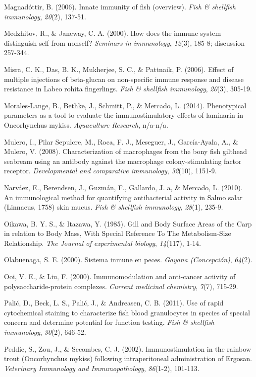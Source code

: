 \documentclass[12pt,letterpaper,oneside]{scrbook}
\begin{document}
Magnadóttir, B. (2006). Innate immunity of fish (overview). \emph{Fish
\& shellfish immunology}, \emph{20}(2), 137-51.

Medzhitov, R., \& Janeway, C. A. (2000). How does the immune system
distinguish self from nonself? \emph{Seminars in immunology},
\emph{12}(3), 185-8; discussion 257-344.

Misra, C. K., Das, B. K., Mukherjee, S. C., \& Pattnaik, P. (2006).
Effect of multiple injections of beta-glucan on non-specific immune
response and disease resistance in Labeo rohita fingerlings. \emph{Fish
\& shellfish immunology}, \emph{20}(3), 305-19.

Morales-Lange, B., Bethke, J., Schmitt, P., \& Mercado, L. (2014).
Phenotypical parameters as a tool to evaluate the immunostimulatory
effects of laminarin in Oncorhynchus mykiss. \emph{Aquaculture
Research}, n/a-n/a.

Mulero, I., {Pilar Sepulcre}, M., Roca, F. J., Meseguer, J.,
García-Ayala, A., \& Mulero, V. (2008). Characterization of macrophages
from the bony fish gilthead seabream using an antibody against the
macrophage colony-stimulating factor receptor. \emph{Developmental and
comparative immunology}, \emph{32}(10), 1151-9.

Narváez, E., Berendsen, J., Guzmán, F., Gallardo, J. a, \& Mercado, L.
(2010). An immunological method for quantifying antibacterial activity
in Salmo salar (Linnaeus, 1758) skin mucus. \emph{Fish \& shellfish
immunology}, \emph{28}(1), 235-9.

Oikawa, B. Y. S., \& Itazawa, Y. (1985). Gill and Body Surface Areas of
the Carp in relation to Body Mass, With Special Reference To The
Metabolism-Size Relationship. \emph{The Journal of experimental
biology}, \emph{14}(117), 1-14.

Olabuenaga, S. E. (2000). Sistema inmune en peces. \emph{Gayana
(Concepción)}, \emph{64}(2).

Ooi, V. E., \& Liu, F. (2000). Immunomodulation and anti-cancer activity
of polysaccharide-protein complexes. \emph{Current medicinal chemistry},
\emph{7}(7), 715-29.

Palić, D., Beck, L. S., Palić, J., \& Andreasen, C. B. (2011). Use of
rapid cytochemical staining to characterize fish blood granulocytes in
species of special concern and determine potential for function testing.
\emph{Fish \& shellfish immunology}, \emph{30}(2), 646-52.

Peddie, S., Zou, J., \& Secombes, C. J. (2002). Immunostimulation in the
rainbow trout (Oncorhynchus mykiss) following intraperitoneal
administration of Ergosan. \emph{Veterinary Immunology and
Immunopathology}, \emph{86}(1-2), 101-113.
\end{document}
